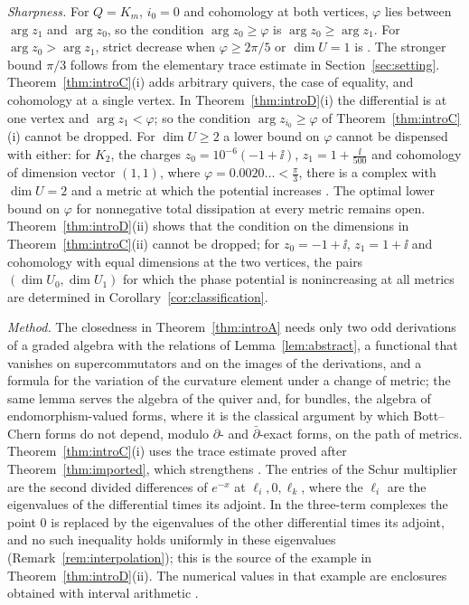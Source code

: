\emph{Sharpness.} For $Q=K_m$, $i_0=0$ and cohomology at both vertices,
$\varphi$ lies between $\arg z_1$ and $\arg z_0$, so the condition
$\arg z_0\geq\varphi$ is $\arg z_0\geq\arg z_1$. For $\arg z_0>\arg z_1$,
strict decrease when $\varphi\geq 2\pi/5$ or $\dim U=1$ is
\cite[Theorem~7.6]{wue26b}. The stronger bound $\pi/3$ follows from the elementary trace estimate
in Section~\ref{sec:setting}. Theorem~\ref{thm:introC}(i) adds
arbitrary quivers, the case of equality, and cohomology at a single vertex. In Theorem~\ref{thm:introD}(i) the differential is at
one vertex and $\arg z_1<\varphi$; so the condition
$\arg z_{i_0}\geq\varphi$ of Theorem~\ref{thm:introC}(i) cannot be dropped.
For $\dim U\geq2$ a lower bound on $\varphi$ cannot be dispensed with
either: for $K_2$, the charges $z_0=10^{-6}(-1+\ii)$, $z_1=1+\frac\ii{500}$
and cohomology of dimension vector $(1,1)$, where
$\varphi=0.0020\ldots<\frac{\pi}3$, there is a complex with $\dim U=2$ and a
metric at which the potential increases \cite[Proposition~10.2]{wue26b}. The optimal lower bound on $\varphi$ for
nonnegative total dissipation at every metric remains open. Theorem~\ref{thm:introD}(ii) shows that the
condition on the dimensions in Theorem~\ref{thm:introC}(ii) cannot be
dropped; for $z_0=-1+\ii$, $z_1=1+\ii$ and cohomology with equal dimensions
at the two vertices, the pairs $(\dim U_0,\dim U_1)$ for which the phase
potential is nonincreasing at all metrics are determined in
Corollary~\ref{cor:classification}.

\emph{Method.} The closedness in Theorem~\ref{thm:introA} needs only two odd
derivations of a graded algebra with the relations of
Lemma~\ref{lem:abstract}, a functional that vanishes on
supercommutators and on the images of the derivations, and a formula for the
variation of the curvature element under a change of metric; the same lemma
serves the algebra of the quiver
and, for bundles, the algebra of endomorphism-valued forms, where it is the
classical argument by which Bott--Chern forms do not depend, modulo
$\partial$- and $\bar\partial$-exact forms, on the path of metrics. Theorem~\ref{thm:introC}(i) uses the trace estimate
proved after Theorem~\ref{thm:imported}, which strengthens
\cite[Theorem~3.1]{wue26b}. The entries of the Schur multiplier are the
second divided differences of $e^{-x}$ at $\ell_i,0,\ell_k$, where the
$\ell_i$ are the eigenvalues of the differential times its adjoint. In the three-term complexes the point $0$ is
replaced by the eigenvalues of the other differential times its adjoint, and
no such inequality holds uniformly in these eigenvalues
(Remark~\ref{rem:interpolation}); this is the source of the example in
Theorem~\ref{thm:introD}(ii). The numerical values in that example are
enclosures obtained with interval arithmetic \cite{joh17}.


